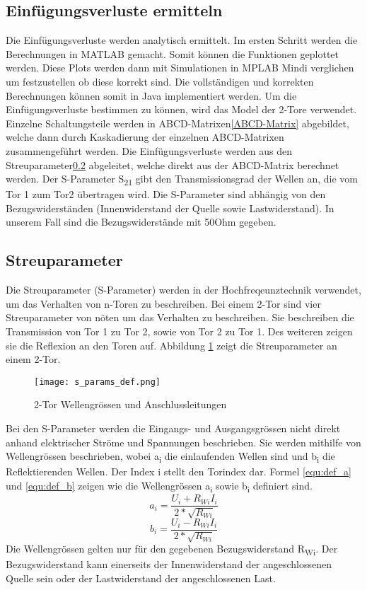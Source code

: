 \subsection{Einfügungsverluste ermitteln} \label{subsec:vorgehen}
Die Einfügungsverluste werden analytisch ermittelt. Im ersten Schritt werden die Berechnungen in MATLAB gemacht. Somit können die Funktionen  geplottet werden. Diese Plots werden dann mit Simulationen in MPLAB Mindi verglichen um festzustellen ob diese korrekt sind. Die vollständigen und korrekten Berechnungen können somit in Java implementiert werden. Um die Einfügungsverluste bestimmen zu können, wird das Model der 2-Tore verwendet. Einzelne Schaltungsteile werden in ABCD-Matrixen\ref{ABCD-Matrix} abgebildet, welche dann durch Kaskadierung der einzelnen ABCD-Matrixen zusammengeführt werden. Die Einfügungsverluste werden aus den Streuparameter\ref{subsec:Streuparameter} abgeleitet, welche direkt aus der ABCD-Matrix berechnet werden.
Der S-Parameter S\textsubscript{21} gibt den Transmissionsgrad der Wellen an, die vom Tor 1 zum Tor2 übertragen wird. Die S-Parameter sind abhängig von den Bezugswiderständen (Innenwiderstand der Quelle sowie Lastwiderstand). In unserem Fall sind die Bezugswiderstände mit 50Ohm gegeben.

\newpage
\subsection{Streuparameter}\label{subsec:Streuparameter}
Die Streuparameter (S-Parameter) werden in der Hochfreqeunztechnik verwendet, um das Verhalten von n-Toren zu beschreiben. Bei einem 2-Tor sind vier Streuparameter von nöten um das Verhalten zu beschreiben. Sie beschreiben die Transmission von Tor 1 zu Tor 2, sowie von Tor 2 zu Tor 1. Des weiteren zeigen sie die Reflexion an den Toren auf. Abbildung \ref{fig:2-Tor}  zeigt die Streuparameter an einem 2-Tor. 
\begin{figure}[H]
	\centering
	\texttt{[image: s\_params\_def.png]}
	\caption{2-Tor Wellengrössen und Anschlussleitungen}
	\label{fig:2-Tor}
\end{figure}
Bei den S-Parameter werden die Eingangs- und Ausgangsgrössen nicht direkt anhand elektrischer Ströme und Spannungen beschrieben. Sie werden mithilfe von Wellengrössen beschrieben, wobei a\textsubscript{i} die einlaufenden Wellen sind und b\textsubscript{i} die Reflektierenden Wellen. Der Index i stellt den Torindex dar. Formel \ref{equ:def_a} und \ref{equ:def_b} zeigen wie die Wellengrössen a\textsubscript{i} sowie b\textsubscript{i} definiert sind.
\begin{equation}\label{equ:def_a}
a_{ i } = \frac{ U_{ i}+R_{ Wi }I_{ i }}{2*\sqrt{ R_{ Wi } }}
\end{equation}
\begin{equation}\label{equ:def_b}
b_{ i } = \frac{ U_{ i}-R_{ Wi }I_{ i }}{2*\sqrt{ R_{ Wi } }}
\end{equation}
Die Wellengrössen gelten nur für den gegebenen Bezugswiderstand R\textsubscript{Wi}. Der Bezugswiderstand kann einerseits der Innenwiderstand der angeschlossenen Quelle sein oder der Lastwiderstand der angeschlossenen Last.

